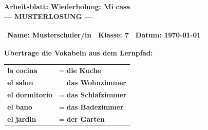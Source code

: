 \documentclass[11pt, a4paper]{article}
\newcommand{\fachfarbe}{spanisch}
\newcommand{\thema}{Wiederholung: Mi casa}
\newcommand{\klasse}{7}
\newcommand{\datum}{\today}
\newcommand{\loesung}[1]{\textcolor{loesung}{\textbf{#1}}}
\newcommand{\es}[1]{\textcolor{\fachfarbe}{\textbf{#1}}}
\begin{document}

\begin{center}
    {\Large\bfseries\textcolor{\fachfarbe}{Arbeitsblatt: \thema}}\\[0.3em]
    {\large\textcolor{loesung}{\textbf{--- MUSTERLOSUNG ---}}}
\end{center}

\vspace{5pt}

\noindent
\begin{tabularx}{\textwidth}{|X|X|X|}
\hline
\textbf{Name:} \textcolor{loesung}{Musterschuler/in} &
\textbf{Klasse:} \klasse &
\textbf{Datum:} \datum \\
\hline
\end{tabularx}

\vspace{15pt}


\begin{merkkasten}
\textbf{Ubertrage die Vokabeln aus dem Lernpfad:}

\vspace{0.5em}

\begin{tabular}{ll}
\es{la cocina} & = \loesung{die Kuche} \\[0.8em]
\es{el salon} & = \loesung{das Wohnzimmer} \\[0.8em]
\es{el dormitorio} & = \loesung{das Schlafzimmer} \\[0.8em]
\es{el bano} & = \loesung{das Badezimmer} \\[0.8em]
\es{el jardin} & = \loesung{der Garten} \\
\end{tabular}
\end{merkkasten}

\vspace{10pt}

\end{document}
